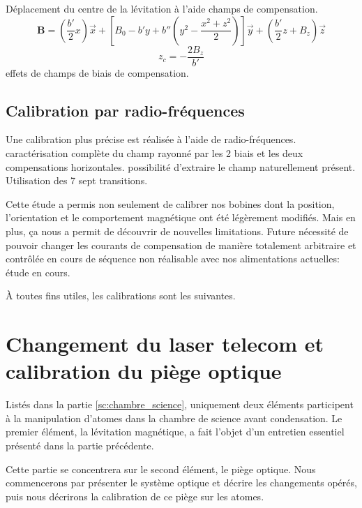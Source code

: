 Déplacement du centre de la lévitation à l'aide champs de compensation.
\begin{equation}
\mathbf{B}=\left( \frac{b'}{2}x \right) \vec{x} + \left[ B_0 - b'y + b'' \left( y^2 - \frac{x^2+z^2}{2} \right) \right] \vec{y} + \left( \frac{b'}{2}z +B_z \right) \vec{z}
\end{equation}
\begin{equation}
z_c=-\frac{2B_z}{b'}
\end{equation}
effets de champs de biais de compensation.







\subsection{Calibration par radio-fréquences}
Une calibration plus précise est réalisée à l'aide de radio-fréquences.
caractérisation complète du champ rayonné par les 2 biais et les deux compensations horizontales. possibilité d'extraire le champ naturellement présent. Utilisation des 7 sept transitions. 




Cette étude a permis non seulement de calibrer nos bobines dont la position, l'orientation et le comportement magnétique ont été légèrement modifiés. Mais en plus, ça nous a permit de découvrir de nouvelles limitations. 
Future nécessité de pouvoir changer les courants de compensation de manière totalement arbitraire et contrôlée en cours de séquence non réalisable avec nos alimentations actuelles: étude en cours. 




À toutes fins utiles, les calibrations sont les suivantes.










\section{Changement du laser telecom et calibration du piège optique}
Listés dans la partie \ref{sc:chambre_science}, uniquement deux éléments participent à la manipulation d'atomes dans la chambre de science avant condensation. Le premier élément, la lévitation magnétique, a fait l'objet d'un entretien essentiel présenté dans la partie précédente. 

Cette partie se concentrera sur le second élément, le piège optique. Nous commencerons par présenter le système optique et décrire les changements opérés, puis nous décrirons la calibration de ce piège sur les atomes.

